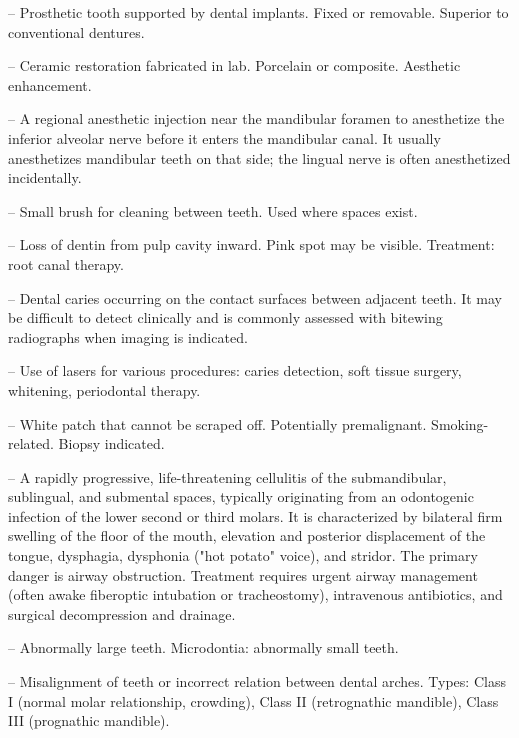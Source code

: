 -- Prosthetic tooth supported by dental implants. Fixed or removable. Superior to conventional dentures.

-- Ceramic restoration fabricated in lab. Porcelain or composite. Aesthetic enhancement.

-- A regional anesthetic injection near the mandibular foramen to anesthetize the inferior alveolar nerve before it enters the mandibular canal. It usually anesthetizes mandibular teeth on that side; the lingual nerve is often anesthetized incidentally.

-- Small brush for cleaning between teeth. Used where spaces exist.

-- Loss of dentin from pulp cavity inward. Pink spot may be visible. Treatment: root canal therapy.

-- Dental caries occurring on the contact surfaces between adjacent teeth. It may be difficult to detect clinically and is commonly assessed with bitewing radiographs when imaging is indicated.

-- Use of lasers for various procedures: caries detection, soft tissue surgery, whitening, periodontal therapy.

-- White patch that cannot be scraped off. Potentially premalignant. Smoking-related. Biopsy indicated.

-- A rapidly progressive, life-threatening cellulitis of the submandibular, sublingual, and submental spaces, typically originating from an odontogenic infection of the lower second or third molars. It is characterized by bilateral firm swelling of the floor of the mouth, elevation and posterior displacement of the tongue, dysphagia, dysphonia ("hot potato" voice), and stridor. The primary danger is airway obstruction. Treatment requires urgent airway management (often awake fiberoptic intubation or tracheostomy), intravenous antibiotics, and surgical decompression and drainage.

-- Abnormally large teeth. Microdontia: abnormally small teeth.

-- Misalignment of teeth or incorrect relation between dental arches. Types: Class I (normal molar relationship, crowding), Class II (retrognathic mandible), Class III (prognathic mandible).

